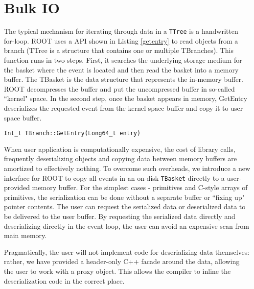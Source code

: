 \section{Bulk IO}
\label{sec:bulkio}

The typical mechanism for iterating through data in a \texttt{TTree} is a handwritten for-loop. ROOT uses a API shown in Listing \ref{getentry} to read objects from a branch (TTree is a structure that contains one or multiple TBranches). This function runs in two steps. First, it searches the underlying storage medium for the basket where the event is located and then read the basket into a memory buffer. The TBasket is the data structure that represents the in-memory buffer. ROOT decompresses the buffer and put the uncompressed buffer in so-called ``kernel" space. In the second step, once the basket appears in memory,  GetEntry deserializes the requested event from the kernel-space buffer and copy it to user-space buffer.

\lstset{
  basicstyle=\ttfamily,
  frame=single,
  xleftmargin=.15\textwidth, xrightmargin=.15\textwidth
}
\begin{lstlisting}[label={getentry}]
  Int_t TBranch::GetEntry(Long64_t entry)
\end{lstlisting}
\vspace{-10pt}

When user application is computationally expensive, the cost of library calls, frequently deserializing objects and copying data between memory buffers are amortized to effectively nothing. To overcome such overheads, we introduce a new interface for ROOT to copy all events in an on-disk \texttt{TBasket} directly to a user-provided memory buffer. For the simplest cases - primitives and C-style arrays of primitives, the serialization can be done without a separate buffer or ``fixing up" pointer contents. The user can request the serialized data or deserialized data to be delivered to the user buffer. By requesting the serialized data directly and deserializing directly in the event loop, the user can avoid an expensive scan from main memory.

Pragmatically, the user will not implement code for deserializing data themselves: rather, we have provided a header-only C++ facade around the data, allowing the user to work with a proxy object.  This allows the compiler to inline the deserialization code in the correct place.

